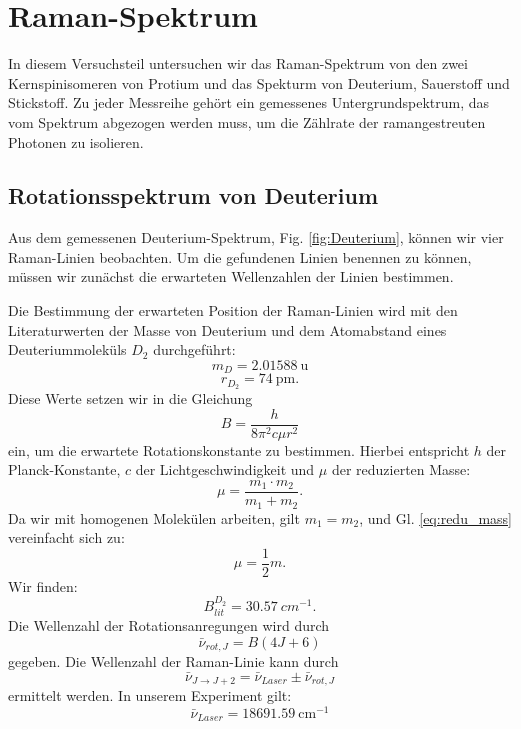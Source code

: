 \documentclass[11pt]{article}
\begin{document}
\section{Raman-Spektrum}
In diesem Versuchsteil untersuchen wir das Raman-Spektrum von den zwei Kernspinisomeren von Protium und das Spekturm von Deuterium, Sauerstoff und Stickstoff. Zu jeder Messreihe gehört ein gemessenes Untergrundspektrum, das vom Spektrum abgezogen werden muss, um die Zählrate der ramangestreuten Photonen zu isolieren.

\subsection{Rotationsspektrum von Deuterium}
Aus dem gemessenen Deuterium-Spektrum, Fig. \ref{fig:Deuterium}, können wir vier Raman-Linien beobachten. Um die gefundenen Linien benennen zu können, müssen wir zunächst die erwarteten Wellenzahlen der Linien bestimmen.

Die Bestimmung der erwarteten Position der Raman-Linien wird mit den Literaturwerten der Masse von Deuterium und dem Atomabstand eines Deuteriummoleküls $D_2$ durchgeführt:
$$m_{D} =\SI{2.01588}{\atomicmassunit}$$
$$r_{D_2} = \SI{74}{\pm}.$$
Diese Werte setzen wir in die Gleichung
\begin{equation}
\label{eq:Rot_const}
B = \frac{h}{8\pi^2 c \mu r^2}
\end{equation}
ein, um die erwartete Rotationskonstante zu bestimmen. Hierbei entspricht $h$ der Planck-Konstante, $c$ der Lichtgeschwindigkeit und $\mu$ der reduzierten Masse:
\begin{equation}
\label{eq:redu_mass}
\mu = \dfrac{m_1 \cdot m_2}{m_1 + m_2}.
\end{equation}
Da wir mit homogenen Molekülen arbeiten, gilt $m_1 = m_2$, und Gl. \ref{eq:redu_mass} vereinfacht sich zu:
\begin{equation}
\mu = \dfrac{1}{2} m.
\end{equation}
Wir finden: 
$$B_{lit}^{D_2} = \SI{30.57}{cm^{-1}}.$$
Die Wellenzahl der Rotationsanregungen wird durch
\begin{equation}
\label{eq:nu_rot,j} 
\bar{\nu}_{rot,J} = B(4J+6)
\end{equation}
gegeben. Die Wellenzahl der Raman-Linie kann durch
\begin{equation}
\bar{\nu}_{J\to J+2} = \bar{\nu}_{Laser} \pm \bar{\nu}_{rot,J}
\end{equation}
ermittelt werden. In unserem Experiment gilt:
$$\bar{\nu}_{Laser} = \SI{18691.59}{\centi\meter^{-1}}$$
\end{document}
